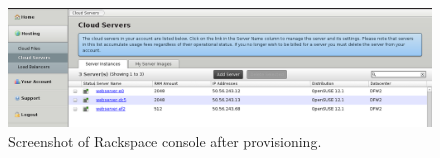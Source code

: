 \begin{figure}[tb]
  \includegraphics[width=\linewidth]{imgs/rackspace-console.png}
  \caption{Screenshot of Rackspace console after provisioning.}
  \label{fig:validation-rackspace}
\end{figure}
